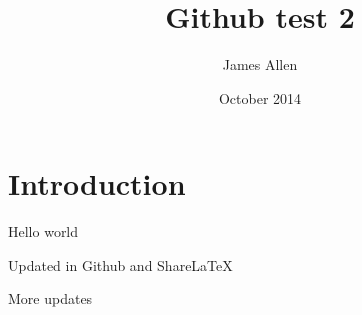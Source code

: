 \documentclass{article}
\title{Github test 2}
\author{James Allen}
\date{October 2014}
\begin{document}
\maketitle

\section{Introduction}

Hello world

Updated in Github and ShareLaTeX

More updates
\end{document}
